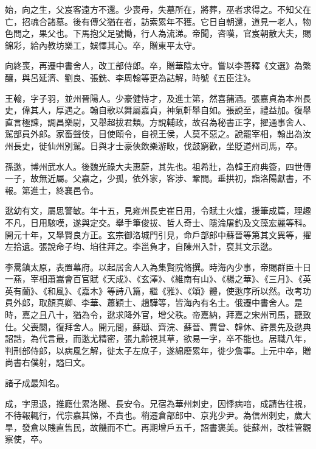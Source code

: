 \begin{pinyinscope}
 始，向之生，父岌客遠方不還。少喪母，失墓所在，將葬，巫者求得之。不知父在亡，招魂合諸墓。後有傳父猶在者，訪索累年不獲。它日自朝還，道見一老人，物色問之，果父也。下馬抱父足號慟，行人為流涕。帝聞，咨嘆，官岌朝散大夫，賜錦彩，給內教坊樂工，娛懌其心。卒，贈東平太守。



 向終喪，再遷中書舍人，改工部侍郎。卒，贈華陰太守。嘗以李善釋《文選》為繁釀，與呂延濟、劉良、張銑、李周翰等更為詁解，時號《五臣注》。



 王翰，字子羽，並州晉陽人。少豪健恃才，及進士第，然喜蒱酒。張嘉貞為本州長史，偉其人，厚遇之。翰自歌以舞屬嘉貞，神氣軒舉自如。張說至，禮益加。復舉直言極諫，調昌樂尉，又舉超拔君類。方說輔政，故召為秘書正字，擢通事舍人、駕部員外郎。家畜聲伎，目使頤令，自視王侯，人莫不惡之。說罷宰相，翰出為汝州長史，徙仙州別駕。日與才士豪俠飲樂游畋，伐鼓窮歡，坐貶道州司馬，卒。



 孫逖，博州武水人。後魏光祿大夫惠蔚，其先也。祖希壯，為韓王府典簽，四世傳一子，故無近屬。父嘉之，少孤，依外家，客涉、鞏間。垂拱初，詣洛陽獻書，不報。第進士，終襄邑令。



 逖幼有文，屬思警敏。年十五，見雍州長史崔日用，令賦土火爐，援筆成篇，理趣不凡，日用駭嘆，遂與定交。舉手筆俊拔、哲人奇士、隱淪屠釣及文藻宏麗等科。開元十年，又舉賢良方正。玄宗御洛城門引見，命戶部郎中蘇晉等第其文異等，擢左拾遺。張說命子均、垍往拜之。李邕負才，自陳州入計，裒其文示逖。



 李暠鎮太原，表置幕府。以起居舍人入為集賢院脩撰。時海內少事，帝賜群臣十日一燕，宰相蕭嵩會百官賦《天成》、《玄澤》、《維南有山》、《楊之華》、《三月》、《英英有蘭》、《和風》、《嘉木》等詩八篇，繼《雅》、《頌》體，使逖序所以然。改考功員外郎，取顏真卿、李華、蕭穎士、趙驊等，皆海內有名士。俄遷中書舍人。是時，嘉之且八十，猶為令，逖求降外官，增父秩。帝嘉納，拜嘉之宋州司馬，聽致仕。父喪闋，復拜舍人。開元間，蘇頲、齊浣、蘇晉、賈曾、韓休、許景先及逖典詔誥，為代言最，而逖尤精密，張九齡視其草，欲易一字，卒不能也。居職八年，判刑部侍郎，以病風乞解，徙太子左庶子，遂綿廢累年，徙少詹事。上元中卒，贈尚書右僕射，謚曰文。



 諸子成最知名。



 成，字思退，推廕仕累洛陽、長安令。兄宿為華州刺史，因悸病喑，成請告往視，不待報輒行，代宗嘉其悌，不責也。稍遷倉部郎中、京兆少尹。為信州刺史，歲大旱，發倉以賤直售民，故饑而不亡。再期增戶五千，詔書褒美。徙蘇州，改桂管觀察使，卒。




\end{pinyinscope}
